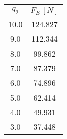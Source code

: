 \begin{tabular}{cc}
\toprule
 $q_2$ &  $F_E\, [N]$ \\
\midrule
  10.0 &      124.827 \\
   9.0 &      112.344 \\
   8.0 &       99.862 \\
   7.0 &       87.379 \\
   6.0 &       74.896 \\
   5.0 &       62.414 \\
   4.0 &       49.931 \\
   3.0 &       37.448 \\
\bottomrule
\end{tabular}
